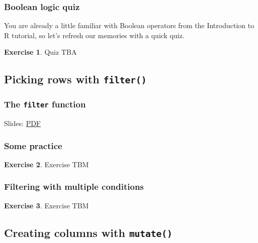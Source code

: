 \documentclass[
]{article}
\theoremstyle{definition}
\theoremstyle{definition}
\theoremstyle{definition}
\newtheorem{exercise}{Exercise}[section]
\theoremstyle{definition}
\theoremstyle{remark}
\begin{document}
\hypertarget{boolean-logic-quiz}{%
\subsubsection{Boolean logic quiz}\label{boolean-logic-quiz}}

You are already a little familiar with Boolean operators from the Introduction to R tutorial, so let's refresh our memories with a quick quiz.

\begin{exercise}
Quiz TBA
\end{exercise}

\hypertarget{picking-rows-with-filter}{%
\subsection{\texorpdfstring{Picking rows with \texttt{filter()}}{Picking rows with filter()}}\label{picking-rows-with-filter}}

\hypertarget{the-filter-function}{%
\subsubsection{\texorpdfstring{The \texttt{filter} function}{The filter function}}\label{the-filter-function}}

Slides: \href{https://drive.google.com/file/d/1bs6q7_PNEqKa6FLYfPY65kwkZtRQ8QKB}{PDF}

\hypertarget{some-practice}{%
\subsubsection{Some practice}\label{some-practice}}

\begin{exercise}
Exercise TBM
\end{exercise}

\hypertarget{filtering-with-multiple-conditions}{%
\subsubsection{Filtering with multiple conditions}\label{filtering-with-multiple-conditions}}

\begin{exercise}
Exercise TBM
\end{exercise}

\hypertarget{creating-columns-with-mutate}{%
\subsection{\texorpdfstring{Creating columns with \texttt{mutate()}}{Creating columns with mutate()}}\label{creating-columns-with-mutate}}
\end{document}
